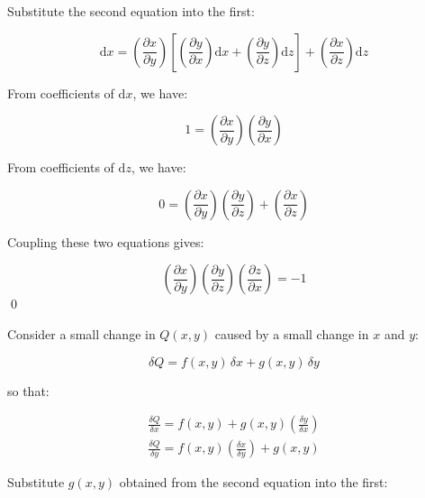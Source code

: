 \documentclass[12pt]{article}
\begin{document}
Substitute the second equation into the first:

\begin{equation}
    \mathrm{d}x = \left( \frac{\partial x}{\partial y} \right) \left[ \left( \frac{\partial y}{\partial x} \right) \mathrm{d}x + \left( \frac{\partial y}{\partial z} \right) \mathrm{d}z \right] + \left( \frac{\partial x}{\partial z} \right) \mathrm{d}z
\end{equation}

From coefficients of $\mathrm{d}x$, we have:

\begin{equation}
    1 = \left( \frac{\partial x}{\partial y} \right) \left( \frac{\partial y}{\partial x} \right)
\end{equation}

From coefficients of $\mathrm{d}z$, we have:

\begin{equation}
    0 = \left( \frac{\partial x}{\partial y} \right) \left( \frac{\partial y}{\partial z} \right) + \left( \frac{\partial x}{\partial z} \right)
\end{equation}

Coupling these two equations gives:

\begin{equation}
    \left( \frac{\partial x}{\partial y} \right) \left( \frac{\partial y}{\partial z} \right) \left( \frac{\partial z}{\partial x} \right) = -1
\end{equation}
\qed


Consider a small change in $Q(x, y)$ caused by a small change in $x$ and $y$:

\begin{equation}
    \delta Q = f(x, y) \, \delta x + g(x, y) \, \delta y
\end{equation}

so that:

\begin{equation}
    \begin{split}
        \frac{\delta Q}{\delta x} = f(x, y) + g(x, y) \left( \frac{\delta y}{\delta x} \right) \\
        \frac{\delta Q}{\delta y} = f(x, y) \left( \frac{\delta x}{\delta y} \right) + g(x, y)
    \end{split}
\end{equation}

Substitute $g(x, y)$ obtained from the second equation into the first:
\end{document}
